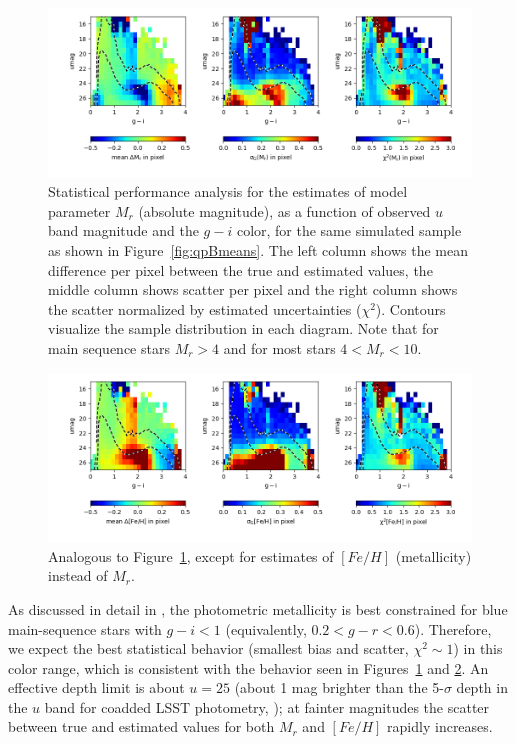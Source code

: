  
\begin{figure}[ht!]
\hskip -0.2in
\includegraphics[width=1.06\textwidth,angle=0]{figures/qpB_estQ_SDSSpatchRA340-350-simLSST_Mr.png}
\vskip -0.3in
\caption{Statistical performance analysis for the estimates of model
  parameter $M_r$ (absolute magnitude), as a function of observed $u$
  band magnitude and the $g-i$ color, for the same simulated sample as shown
  in Figure~\ref{fig:qpBmeans}. 
  The left column shows the mean difference per pixel between the true
  and estimated values, the middle column shows scatter per pixel and
  the right column shows the scatter normalized by estimated
  uncertainties ($\chi^2$). Contours visualize the sample distribution in each
  diagram. Note that for main sequence stars $M_r>4$ and for most
  stars $4 < M_r < 10$. 
\label{fig:perfVSestParamsMr}}
\end{figure}

\begin{figure}[h!]
\hskip -0.2in
\includegraphics[width=1.06\textwidth,angle=0]{figures/qpB_estQ_SDSSpatchRA340-350-simLSST_FeH.png}
\vskip -0.3in
\caption{Analogous to Figure~\ref{fig:perfVSestParamsMr}, except for estimates of $[Fe/H]$ (metallicity) instead of $M_r$. 
\label{fig:perfVSestParamsFeH}}
\end{figure}


As discussed in detail in \cite{2008ApJ...684..287I}, the photometric metallicity is best constrained for blue main-sequence stars with
$g-i<1$ (equivalently, $0.2 < g - r < 0.6$).
Therefore, we expect the best statistical behavior (smallest bias and scatter, $\chi^2 \sim 1$) in this color range, which is consistent with
the behavior seen in Figures~\ref{fig:perfVSestParamsMr} and \ref{fig:perfVSestParamsFeH}. An effective depth limit is about
$u=25$ (about 1 mag brighter than the 5-$\sigma$ depth in the $u$ band for coadded LSST photometry,  \citealt{2022ApJS..258....1B}); 
at fainter magnitudes the scatter between true and estimated values
for both $M_r$ and $[Fe/H]$ rapidly increases.

